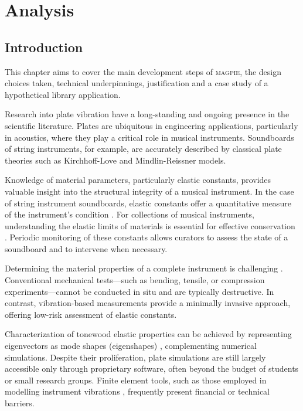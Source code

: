 \chapter{Analysis}\label{ch:analysis}

\section{Introduction}

This chapter aims to cover the main development steps of \textsc{magpie}, the design choices taken, technical underpinnings, justification and a case study of a hypothetical library application.

Research into plate vibration have a long-standing and ongoing presence in the scientific literature. Plates are ubiquitous in engineering applications, particularly in acoustics, where they play a critical role in musical instruments. Soundboards of string instruments, for example, are accurately described by classical plate theories such as Kirchhoff-Love \cite{love_small_1888} and Mindlin-Reissner \cite{mindlin_influence_1951} models.

Knowledge of material parameters, particularly elastic constants, provides valuable insight into the structural integrity of a musical instrument. In the case of string instrument soundboards, elastic constants offer a quantitative measure of the instrument’s condition \cite{viala_decision_2025,duran_use_2025}. For collections of musical instruments, understanding the elastic limits of materials is essential for effective conservation \cite[p. 19-20]{barclay_care_1997}. Periodic monitoring of these constants allows curators to assess the state of a soundboard and to intervene when necessary.

Determining the material properties of a complete instrument is challenging \cite{viala_model_2019}. Conventional mechanical tests—such as bending, tensile, or compression experiments—cannot be conducted in situ and are typically destructive. In contrast, vibration-based measurements provide a minimally invasive approach, offering low-risk assessment of elastic constants.

Characterization of tonewood elastic properties can be achieved by representing eigenvectors as mode shapes (eigenshapes) \cite{ducceschi_method_2024}, complementing numerical simulations. Despite their proliferation, plate simulations are still largely accessible only through proprietary software, often beyond the budget of students or small research groups. Finite element tools, such as those employed in modelling instrument vibrations \cite{viala_model_2019}, frequently present financial or technical barriers.

